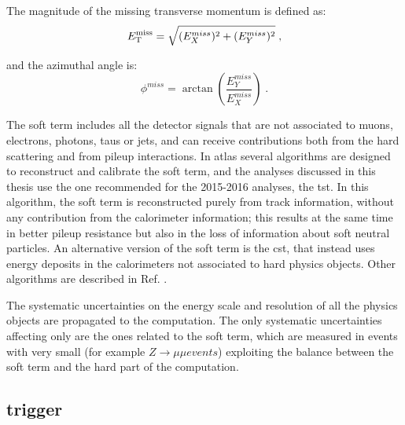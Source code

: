 The magnitude of the missing transverse momentum is defined as:
\begin{equation}
E_{\rm T}^{\mathrm{miss}} = \sqrt{(E_{X}^{miss})^{2}  +  (E_{Y}^{miss})^{2}} \;,
\end{equation}

\noindent and the azimuthal angle is:
\begin{equation}
\phi^{miss} = \arctan \left( \frac{E_Y^{miss}}{E_X^{miss}} \right) \; .
\end{equation}

The soft term includes all the detector signals that are not associated to muons, electrons, photons, taus or jets, and can receive contributions
both from the hard scattering and from pileup interactions. 
In \gls{atlas} several algorithms are designed to reconstruct and calibrate the \met soft term, and the analyses discussed in this thesis use 
the one recommended for the 2015-2016 analyses, the \gls{tst}. In this algorithm, the \met soft term is reconstructed purely from track information, without any contribution from the calorimeter information; 
this results at the same time in better pileup resistance but also in the loss of information about soft neutral particles. 
An alternative version of the soft term is the \gls{cst}, that instead uses energy deposits in the calorimeters not associated to hard physics objects. 
Other algorithms are described in Ref. \cite{Aad:2016nrq}.

The systematic uncertainties on the energy scale and resolution of all the physics objects are propagated to the \met computation.
The only systematic uncertainties affecting only \met are the ones related to the soft term, which are measured in events with very small 
\met (for example $Z \rightarrow \mu \mu events$) exploiting the balance between the soft term and the hard part of the \met computation.

\subsection{\met trigger}

